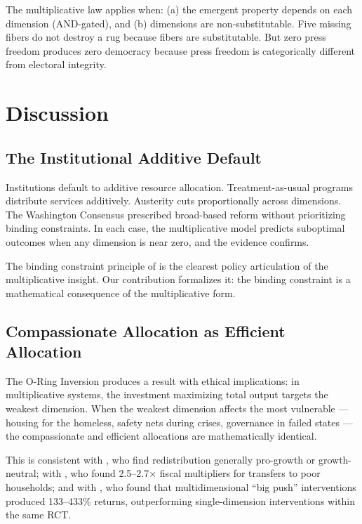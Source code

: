 \documentclass[12pt]{article}
\begin{document}
The multiplicative law applies when: (a) the emergent property depends on each dimension (AND-gated), and (b) dimensions are non-substitutable. Five missing fibers do not destroy a rug because fibers are substitutable. But zero press freedom produces zero democracy because press freedom is categorically different from electoral integrity.


\section{Discussion}
\label{sec:discussion}

\subsection{The Institutional Additive Default}

Institutions default to additive resource allocation. Treatment-as-usual programs distribute services additively. Austerity cuts proportionally across dimensions. The Washington Consensus prescribed broad-based reform without prioritizing binding constraints. In each case, the multiplicative model predicts suboptimal outcomes when any dimension is near zero, and the evidence confirms.

The binding constraint principle of \citet{hrv2005} is the clearest policy articulation of the multiplicative insight. Our contribution formalizes it: the binding constraint is a mathematical consequence of the multiplicative form.

\subsection{Compassionate Allocation as Efficient Allocation}

The O-Ring Inversion produces a result with ethical implications: in multiplicative systems, the investment maximizing total output targets the weakest dimension. When the weakest dimension affects the most vulnerable --- housing for the homeless, safety nets during crises, governance in failed states --- the compassionate and efficient allocations are mathematically identical.

This is consistent with \citet{ostry2014redistribution}, who find redistribution generally pro-growth or growth-neutral; with \citet{egger2022kenya}, who found 2.5--2.7$\times$ fiscal multipliers for transfers to poor households; and with \citet{banerjee2015brac}, who found that multidimensional ``big push'' interventions produced 133--433\% returns, outperforming single-dimension interventions within the same RCT.
\end{document}
